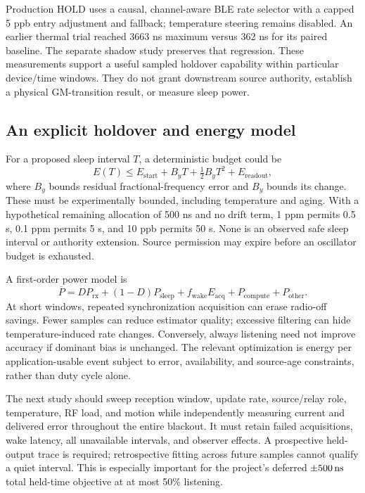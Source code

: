 \documentclass[11pt,letterpaper]{article}
\begin{document}
Production HOLD uses a causal, channel-aware BLE rate selector with a capped 5 ppb entry adjustment and fallback; temperature steering remains disabled. An earlier thermal trial reached 3663 ns maximum versus 362 ns for its paired baseline. The separate shadow study preserves that regression. These measurements support a useful sampled holdover capability within particular device/time windows. They do not grant downstream source authority, establish a physical GM-transition result, or measure sleep power.

\subsection{An explicit holdover and energy model}
For a proposed sleep interval $T$, a deterministic budget could be
\begin{equation}
E(T)\leq E_{\mathrm{start}}+B_yT+\tfrac12 B_{\dot y}T^2+E_{\mathrm{readout}},
\end{equation}
where $B_y$ bounds residual fractional-frequency error and $B_{\dot y}$ bounds its change. These must be experimentally bounded, including temperature and aging. With a hypothetical remaining allocation of 500 ns and no drift term, 1 ppm permits 0.5 s, 0.1 ppm permits 5 s, and 10 ppb permits 50 s. None is an observed safe sleep interval or authority extension. Source permission may expire before an oscillator budget is exhausted.

A first-order power model is
\begin{equation}
\overline P=D P_{\mathrm{rx}}+(1-D)P_{\mathrm{sleep}}+f_{\mathrm{wake}}E_{\mathrm{acq}}+P_{\mathrm{compute}}+P_{\mathrm{other}}.
\end{equation}
At short windows, repeated synchronization acquisition can erase radio-off savings. Fewer samples can reduce estimator quality; excessive filtering can hide temperature-induced rate changes. Conversely, always listening need not improve accuracy if dominant bias is unchanged. The relevant optimization is energy per application-usable event subject to error, availability, and source-age constraints, rather than duty cycle alone.

The next study should sweep reception window, update rate, source/relay role, temperature, RF load, and motion while independently measuring current and delivered error throughout the entire blackout. It must retain failed acquisitions, wake latency, all unavailable intervals, and observer effects. A prospective held-output trace is required; retrospective fitting across future samples cannot qualify a quiet interval. This is especially important for the project's deferred $\pm500\,\mathrm{ns}$ total held-time objective at at most 50\% listening.
\end{document}
